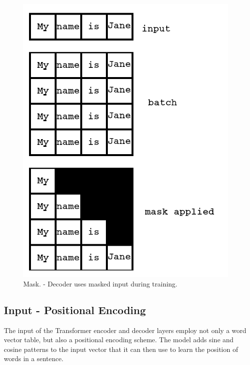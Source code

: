 \begin{figure}[H]
	\begin{center}
		
		
		\includegraphics[scale=1.25]{diagram-mask01}
	\end{center}
	\caption[Decoder Mask]{Mask. - Decoder uses masked input during training.}
	
	\label{diagram-mask-01}
\end{figure}



\subsection{Input - Positional Encoding}
The input of the Transformer encoder and decoder layers employ not only a word vector table, but also a positional encoding scheme. The model adds sine and cosine patterns to the input vector that it can then use to learn the position of words in a sentence. 

